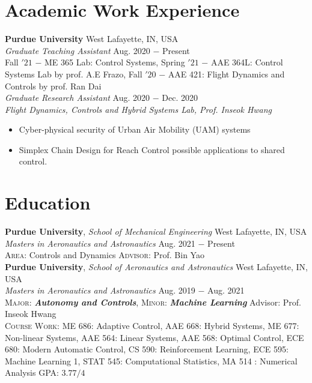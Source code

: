\documentclass[letterpaper,10pt]{article}
\begin{document}
\section{Academic Work Experience}
\noindent \textbf{Purdue University} \hfill West Lafayette, IN, USA \\
\vspace{3pt}
\noindent \textit{Graduate Teaching Assistant} \hfill Aug. 2020 $-$ Present\\
Fall $'21$ $-$ ME 365 Lab: Control Systems,
Spring $'21$ $-$ AAE 364L: Control Systems Lab by prof. A.E Frazo,
Fall $'20$ $-$ AAE 421: Flight Dynamics and Controls by prof. Ran Dai\\
\vspace{3pt}
\noindent \textit{Graduate Research Assistant } \hfill Aug. 2020 $-$ Dec. 2020\\
\textit{Flight Dynamics, Controls and Hybrid Systems Lab, \hfill Prof. Inseok Hwang}
\begin{itemize}[noitemsep,nolistsep,leftmargin=0.25in,label={--}]
    \item Cyber-physical security of Urban Air Mobility (UAM) systems
	\item Simplex Chain Design for Reach Control possible applications to shared control.
\end{itemize}



\section{Education}
\noindent \textbf{Purdue University}, \textit{School of Mechanical Engineering} \hfill West Lafayette, IN, USA \\
\textit{Masters in Aeronautics and Astronautics} \hfill Aug. 2021 $-$ Present\\
\textsc{Area}: Controls and Dynamics \hfill \textsc{Advisor}: Prof. Bin Yao\\
\vspace{5pt}
\noindent \textbf{Purdue University}, \textit{School of Aeronautics and Astronautics} \hfill West Lafayette, IN, USA \\
\textit{Masters in Aeronautics and Astronautics} \hfill Aug. 2019 $-$ Aug. 2021\\
\textsc{Major}: \textit{\textbf{Autonomy and Controls}}, \textsc{Minor}: \textit{\textbf{Machine Learning}}
\hfill Advisor: Prof. Inseok Hwang\\
\textsc{Course Work}: ME 686: Adaptive Control, AAE 668: Hybrid Systems, ME 677: Non-linear Systems, AAE 564: Linear Systems,  AAE 568: Optimal Control, ECE 680: Modern Automatic Control, CS 590: Reinforcement Learning, ECE 595: Machine Learning 1, STAT 545: Computational Statistics, MA 514 : Numerical Analysis
\hfill \textsc{GPA}: $3.77/4$\\
\end{document}
